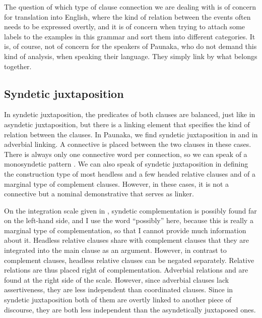 
The question of which type of clause connection we are dealing with is of concern for translation into English, where the kind of relation between the events often needs to be expressed overtly, and it is of concern when trying to attach some labels to the examples in this grammar and sort them into different categories. It is, of course, not of concern for the speakers of Paunaka, who do not demand this kind of analysis, when speaking their language. They simply link by  what belongs together.

\subsection{Syndetic juxtaposition}\label{sec:SyndeticJuxtaposition}

In syndetic juxtaposition, the predicates of both clauses are balanced, just like in asyndetic juxtaposition, but there is a linking element that specifies the kind of relation between the clauses. %
In Paunaka, we find syndetic juxtaposition in  and in adverbial linking. A connective is placed between the two clauses in these cases. There is always only one connective word per connection, so we can speak of a monosyndetic pattern \citep[cf.][4]{Haspelmath2004}. We can also speak of syndetic juxtaposition in defining the construction type of most headless and a few headed relative clauses and of a marginal type of complement clauses. However, in these cases, it is not a connective but a nominal demonstrative that serves as linker.

On the integration scale given in , syndetic complementation is possibly found far on the left-hand side, and I use the word “possibly” here, because this is really a marginal type of complementation, so that I cannot provide much information about it. Headless relative clauses share with complement clauses that they are integrated into the main clause as an argument. However, in contrast to complement clauses, headless relative clauses can be negated separately. Relative relations are thus placed right of complementation. Adverbial relations and  are found at the right side of the scale. However, since adverbial clauses lack assertiveness, they are less independent than coordinated clauses. Since in syndetic juxtaposition both of them are overtly linked to another piece of discourse, they are both less independent than the asyndetically juxtaposed ones.

